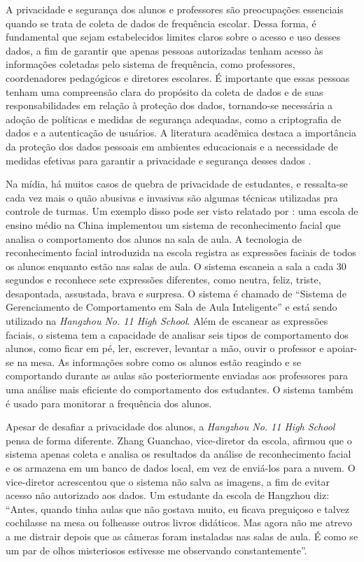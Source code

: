 A privacidade e segurança dos alunos e professores são preocupações essenciais quando se trata de coleta de dados de frequência escolar. Dessa forma, é fundamental que sejam estabelecidos limites claros sobre o acesso e uso desses dados, a fim de garantir que apenas pessoas autorizadas tenham acesso às informações coletadas pelo sistema de frequência, como professores, coordenadores pedagógicos e diretores escolares. É importante que essas pessoas tenham uma compreensão clara do propósito da coleta de dados e de suas responsabilidades em relação à proteção dos dados, tornando-se necessária a adoção de políticas e medidas de segurança adequadas, como a criptografia de dados e a autenticação de usuários. A literatura acadêmica destaca a importância da proteção dos dados pessoais em ambientes educacionais e a necessidade de medidas efetivas para garantir a privacidade e segurança desses dados \cite{Amo2021}.

Na mídia, há muitos casos de quebra de privacidade de estudantes, e ressalta-se cada vez mais o quão abusivas e invasivas são algumas técnicas utilizadas pra controle de turmas. Um exemplo disso pode ser visto relatado por : uma escola de ensino médio na China implementou um sistema de reconhecimento facial que analisa o comportamento dos alunos na sala de aula. A tecnologia de reconhecimento facial introduzida na escola registra as expressões faciais de todos os alunos enquanto estão nas salas de aula. O sistema escaneia a sala a cada 30 segundos e reconhece sete expressões diferentes, como neutra, feliz, triste, desapontada, assustada, brava e surpresa. O sistema é chamado de ``Sistema de Gerenciamento de Comportamento em Sala de Aula Inteligente'' e está sendo utilizado na \textit{Hangzhou No. 11 High School}. Além de escanear as expressões faciais, o sistema tem a capacidade de analisar seis tipos de comportamento dos alunos, como ficar em pé, ler, escrever, levantar a mão, ouvir o professor e apoiar-se na mesa. As informações sobre como os alunos estão reagindo e se comportando durante as aulas são posteriormente enviadas aos professores para uma análise mais eficiente do comportamento dos estudantes. O sistema também é usado para monitorar a frequência dos alunos.

Apesar de desafiar a privacidade dos alunos, a {\textit{Hangzhou No. 11 High School}} pensa de forma diferente. Zhang Guanchao, vice-diretor da escola, afirmou que o sistema apenas coleta e analisa os resultados da análise de reconhecimento facial e os armazena em um banco de dados local, em vez de enviá-los para a nuvem. O vice-diretor acrescentou que o sistema não salva as imagens, a fim de evitar acesso não autorizado aos dados. Um estudante da escola de Hangzhou diz: ``Antes, quando tinha aulas que não gostava muito, eu ficava preguiçoso e talvez cochilasse na mesa ou folheasse outros livros didáticos. Mas agora não me atrevo a me distrair depois que as câmeras foram instaladas nas salas de aula. É como se um par de olhos misteriosos estivesse me observando constantemente''.  


